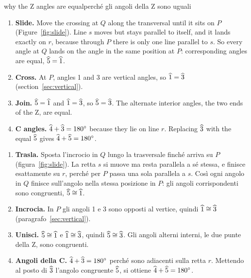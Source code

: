 \begin{rebuild}{why the Z angles are equal}{perché gli angoli della Z sono uguali}
\begin{enumerate}[label=\arabic*.]
\item \textbf{Slide.} Move the crossing at $Q$ along the transversal until it sits on $P$ (Figure~\ref{fig:slide}). Line $s$ moves but stays parallel to itself, and it lands exactly on $r$, because through $P$ there is only one line parallel to $s$. So every angle at $Q$ lands on the angle in the same position at $P$: corresponding angles are equal, $\widehat{5} = \widehat{1}$.
\item \textbf{Cross.} At $P$, angles 1 and 3 are vertical angles, so $\widehat{1} = \widehat{3}$ (section~\ref{sec:vertical}).
\item \textbf{Join.} $\widehat{5} = \widehat{1}$ and $\widehat{1} = \widehat{3}$, so $\widehat{5} = \widehat{3}$. The alternate interior angles, the two ends of the Z, are equal.
\item \textbf{C angles.} $\widehat{4} + \widehat{3} = 180^\circ$ because they lie on line $r$. Replacing $\widehat{3}$ with the equal $\widehat{5}$ gives $\widehat{4} + \widehat{5} = 180^\circ$.
\end{enumerate}
\tcblower
\begin{enumerate}[label=\arabic*.]
\item \textbf{Trasla.} Sposta l'incrocio in $Q$ lungo la trasversale finché arriva su $P$ (figura~\ref{fig:slide}). La retta $s$ si muove ma resta parallela a sé stessa, e finisce esattamente su $r$, perché per $P$ passa una sola parallela a $s$. Così ogni angolo in $Q$ finisce sull'angolo nella stessa posizione in $P$: gli angoli corrispondenti sono congruenti, $\widehat{5} \cong \widehat{1}$.
\item \textbf{Incrocia.} In $P$ gli angoli 1 e 3 sono opposti al vertice, quindi $\widehat{1} \cong \widehat{3}$ (paragrafo~\ref{sec:vertical}).
\item \textbf{Unisci.} $\widehat{5} \cong \widehat{1}$ e $\widehat{1} \cong \widehat{3}$, quindi $\widehat{5} \cong \widehat{3}$. Gli angoli alterni interni, le due punte della Z, sono congruenti.
\item \textbf{Angoli della C.} $\widehat{4} + \widehat{3} = 180^\circ$ perché sono adiacenti sulla retta $r$. Mettendo al posto di $\widehat{3}$ l'angolo congruente $\widehat{5}$, si ottiene $\widehat{4} + \widehat{5} = 180^\circ$.
\end{enumerate}
\end{rebuild}

